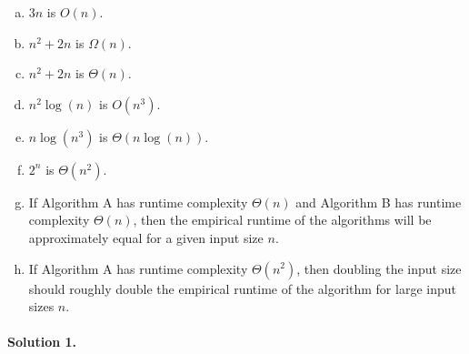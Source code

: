 \documentclass[11pt]{article}
\begin{document}
\begin{enumerate}[(a)]
    \item $3n$ is $O(n)$.
    
    \item $n^2 + 2n$  is $\Omega(n)$.

    \item $n^2 + 2n$  is $\Theta(n)$.
    
	\item $n^2 \log(n)$ is $O(n^3)$.
    
    \item $n\log(n^3)$ is $\Theta(n \log(n))$.

    \item $2^n$ is $\Theta(n^2)$.

    \item If Algorithm A has runtime complexity $\Theta(n)$ and Algorithm B 
        has runtime complexity $\Theta(n)$, then the empirical runtime of the
        algorithms will be approximately equal for a given input size $n$.

    \item If Algorithm A has runtime complexity $\Theta(n^2)$, then doubling 
        the input size should roughly double the empirical runtime of the
        algorithm for large input sizes $n$.
\end{enumerate}

\paragraph{Solution 1.}
\end{document}
